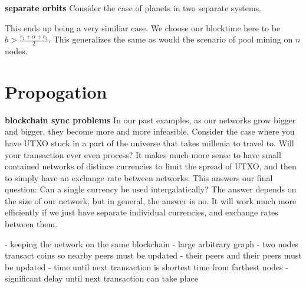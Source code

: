 \documentclass[conference]{IEEEtran}
\begin{document}
\textbf{separate orbits}
Consider the case of planets in two separate systems.
\begin{center}
\end{center}

This ends up being a very similiar case. We choose our blocktime here to be $b > \frac{r_1 + \alpha + r_2}{2}$. This generalizes the same as would the scenario of pool mining on $n$ nodes.

\section{Propogation}


\textbf{blockchain sync problems}
In our past examples, as our networks grow bigger and bigger, they become more and more infeasible. Consider the case where you have UTXO stuck in a part of the universe that takes millenia to travel to. Will your transaction ever even process? It makes much more sense to have small contained networks of distince currencies to limit the spread of UTXO, and then to simply have an exchange rate between networks. This answers our final question: Can a single currency be used intergalatically? The answer depends on the size of our network, but in general, the answer is no. It will work much more efficiently if we just have separate individual currencies, and exchange rates between them.

    - keeping the network on the same blockchain
        - large arbitrary graph 
        - two nodes transact coins so nearby peers must be updated
        - their peers and their peers must be updated
        - time until next transaction is shortest time from farthest nodes
        - significant delay until next transaction can take place
\end{document}
